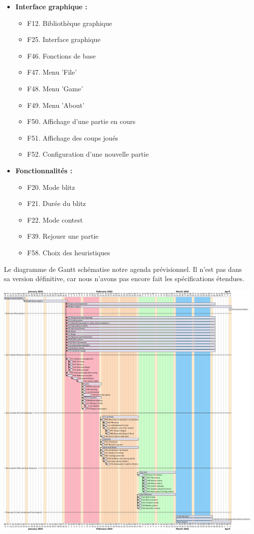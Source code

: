 \documentclass{article}
\begin{document}
\begin{itemize}
    \item \textbf{Interface graphique :}
    \begin{itemize}
        \item F12. Bibliothèque graphique
        \item F25. Interface graphique
        \item F46. Fonctions de base
        \item F47. Menu 'File'
        \item F48. Menu 'Game'
        \item F49. Menu 'About'
        \item F50. Affichage d'une partie en cours
        \item F51. Affichage des coups joués
        \item F52. Configuration d'une nouvelle partie
    \end{itemize}
    \item \textbf{Fonctionnalités :}
    \begin{itemize}
        \item F20. Mode blitz
        \item F21. Durée du blitz
        \item F22. Mode contest
        \item F39. Rejouer une partie
        \item F58. Choix des heuristiques
    \end{itemize}
\end{itemize}



Le diagramme de Gantt schématise notre agenda prévisionnel. Il n'est pas dans sa version définitive, car nous n'avons
pas encore fait les spécifications étendues.

\begin{center}
    \includegraphics[width=\textwidth,height=\textheight,keepaspectratio]{gantt}
\end{center}
\end{document}
